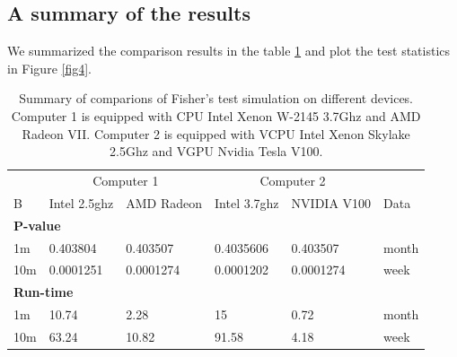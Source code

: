 \documentclass[article,nojss]{jss}\usepackage[]{graphicx}\usepackage[]{color}
\newenvironment{knitrout}{}{} %
\begin{document}
\subsection{A summary of the results}
We summarized the comparison results in the table \ref{tab:summary} and plot the test statistics in Figure \ref{fig4}.
\begin{knitrout}
\color{fgcolor}\begin{table}[H]

\caption{\label{tab:summarycompare}Summary of comparions of Fisher's test simulation on different devices. Computer 1 is equipped with CPU Intel Xenon W-2145 3.7Ghz and AMD Radeon VII. Computer 2 is equipped with VCPU Intel Xenon Skylake 2.5Ghz and VGPU Nvidia Tesla V100.\label{tab:summary}}
\centering
\begin{tabular}[t]{l|l|l|l|l|l}
\hline
\multicolumn{1}{c|}{ } & \multicolumn{2}{c|}{Computer 1} & \multicolumn{2}{c|}{Computer 2} & \multicolumn{1}{c}{ } \\
\cline{2-3} \cline{4-5}
B & Intel 2.5ghz & AMD Radeon & Intel 3.7ghz & NVIDIA V100 & Data\\
\hline
\multicolumn{6}{l}{\textbf{P-value}}\\
\hline
\hspace{1em}1m & 0.403804 & 0.403507 & 0.4035606 & 0.403507 & month\\
\hline
\hspace{1em}10m & 0.0001251 & 0.0001274 & 0.0001202 & 0.0001274 & week\\
\hline
\multicolumn{6}{l}{\textbf{Run-time}}\\
\hline
\hspace{1em}1m & 10.74 & 2.28 & 15 & 0.72 & month\\
\hline
\hspace{1em}10m & 63.24 & 10.82 & 91.58 & 4.18 & week\\
\hline
\end{tabular}
\end{table}

\end{knitrout}
\end{document}
